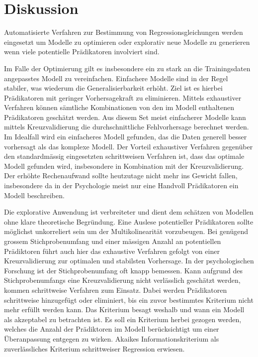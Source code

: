 \section{Diskussion}
Automatisierte Verfahren zur Bestimmung von Regressionsgleichungen werden eingesetzt um Modelle zu optimieren oder explorativ neue Modelle zu generieren wenn viele potentielle Prädikatoren involviert sind. 

Im Falle der Optimierung gilt es insbesondere ein zu stark an die Trainingsdaten angepasstes Modell zu vereinfachen. 
Einfachere Modelle sind in der Regel stabiler, was wiederum die Generalisierbarkeit erhöht.
Ziel ist es hierbei Prädikatoren mit geringer Vorhersagekraft zu eliminieren. Mittels exhaustiver Verfahren können sämtliche Kombinationen von den im Modell enthaltenen Prädikatoren geschätzt werden.
Aus diesem Set meist einfacherer Modelle kann mittels Kreuzvalidierung die durchschnittliche Fehlvorhersage berechnet werden. Im Idealfall wird ein einfacheres Modell gefunden, das die Daten generell besser vorhersagt als das komplexe Modell.
Der Vorteil exhaustiver Verfahren gegenüber den standardmässig eingesetzten schrittweisen Verfahren ist, dass das optimale Modell gefunden wird, insbesondere in Kombination mit der Kreuzvalidierung.
Der erhöhte Rechenaufwand sollte heutzutage nicht mehr ins Gewicht fallen, insbesondere da in der Psychologie meist nur eine Handvoll Prädikatoren ein Modell beschreiben.  

Die explorative Anwendung ist verbreiteter und dient dem schätzen von Modellen ohne klare theoretische Begründung.
Eine Auslese potentieller Prädikatoren sollte möglichst unkorreliert sein um der Multikolinearität vorzubeugen. Bei genügend grossem Stichprobenumfang und einer mässigen Anzahl an potentiellen Prädiktoren führt auch hier das exhaustive Verfahren gefolgt von einer Kreuzvalidierung zur optimalen und stabilsten Vorhersage. In der psychologischen Forschung ist der Stichprobenumfang oft knapp bemessen. Kann aufgrund des Stichprobenumfangs eine Kreuzvalidierung nicht verlässlich geschätzt werden, kommen schrittweise Verfahren zum Einsatz. Dabei werden Prädikatoren schrittweise hinzugefügt oder eliminiert, bis ein zuvor bestimmtes Kriterium nicht mehr erfüllt werden kann. Das Kriterium  besagt weshalb und wann ein Modell als akzeptabel zu betrachten ist.
Es soll ein Kriterium herbei gezogen werden, welches die Anzahl der Prädiktoren im Modell berücksichtigt um einer Überanpassung entgegen zu wirken.
Akaikes Informationskriterium als zuverlässliches Kriterium schrittweiser Regression erwiesen.  

